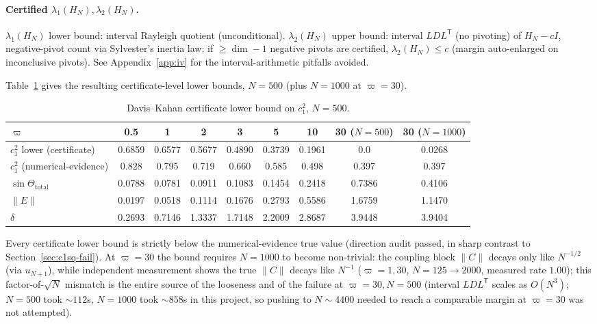 \documentclass[11pt]{article}
\begin{document}
\paragraph{Certified $\lambda_1(H_N),\lambda_2(H_N)$.} $\lambda_1(H_N)$ lower
bound: interval Rayleigh quotient (unconditional). $\lambda_2(H_N)$ upper
bound: interval $LDL^{\mathsf T}$ (no pivoting) of $H_N-cI$, negative-pivot
count via Sylvester's inertia law; if $\ge\dim-1$ negative pivots are
certified, $\lambda_2(H_N)\le c$ (margin auto-enlarged on inconclusive
pivots). See Appendix~\ref{app:iv} for the interval-arithmetic pitfalls
avoided.

Table~\ref{tab:dk} gives the resulting certificate-level lower bounds,
$N=500$ (plus $N=1000$ at $\varpi=30$).

\begin{table}[h]
\centering
\caption{Davis--Kahan certificate lower bound on $c_1^2$, $N=500$.}
\label{tab:dk}
\begin{tabular}{lcccccccc}
\toprule
$\varpi$ & 0.5 & 1 & 2 & 3 & 5 & 10 & 30 ($N{=}500$) & 30 ($N{=}1000$)\\
\midrule
$c_1^2$ lower (certificate) & 0.6859 & 0.6577 & 0.5677 & 0.4890 & 0.3739 & 0.1961 & 0.0 & 0.0268\\
$c_1^2$ (numerical-evidence) & 0.828 & 0.795 & 0.719 & 0.660 & 0.585 & 0.498 & 0.397 & 0.397\\
$\sin\Theta_{\text{total}}$ & 0.0788 & 0.0781 & 0.0911 & 0.1083 & 0.1454 & 0.2418 & 0.7386 & 0.4106\\
$\|E\|$ & 0.0197 & 0.0518 & 0.1114 & 0.1676 & 0.2793 & 0.5586 & 1.6759 & 1.1470\\
$\delta$ & 0.2693 & 0.7146 & 1.3337 & 1.7148 & 2.2009 & 2.8687 & 3.9448 & 3.9404\\
\bottomrule
\end{tabular}
\end{table}

Every certificate lower bound is strictly below the numerical-evidence true
value (direction audit passed, in sharp contrast to
Section~\ref{sec:c1sq-fail}). At $\varpi=30$ the bound requires $N=1000$ to
become non-trivial: the coupling block $\|C\|$ decays only like
$N^{-1/2}$ (via $u_{N+1}$), while independent measurement shows the true
$\|C\|$ decays like $N^{-1}$ ($\varpi=1,30$, $N=125\to2000$, measured rate
$1.00$); this factor-of-$\sqrt N$ mismatch is the entire source of the
looseness and of the failure at $\varpi=30,N=500$ (interval $LDL^{\mathsf T}$
scales as $O(N^3)$; $N=500$ took $\sim112$s, $N=1000$ took $\sim858$s in this
project, so pushing to $N\sim4400$ needed to reach a comparable margin at
$\varpi=30$ was not attempted).
\end{document}
